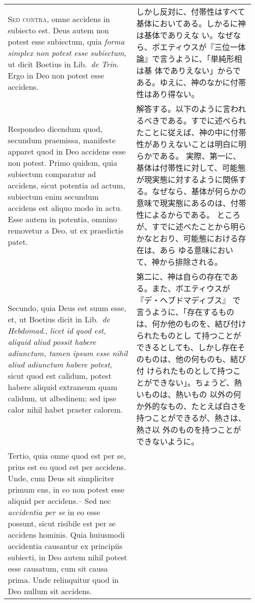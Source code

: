 \documentclass[10pt]{jsarticle} %
\begin{document}
\begin{longtable}{p{21em}p{21em}}
\\


{\scshape Sed contra}, omne accidens in subiecto est. Deus autem non
 potest esse subiectum, quia {\itshape forma simplex non potest esse
 subiectum}, ut dicit Boetius in Lib.~{\itshape de Trin}. Ergo in Deo
 non potest esse accidens.

&

しかし反対に、付帯性はすべて基体においてある。しかるに神は基体でありえな
 い。なぜなら、ボエティウスが『三位一体論』で言うように、「単純形相は基
 体でありえない」からである。ゆえに、神のなかに付帯性はあり得ない。

\\

Respondeo dicendum quod, secundum praemissa, manifeste apparet quod in
 Deo accidens esse non potest. 
Primo quidem, quia subiectum comparatur ad accidens, sicut potentia ad actum, subiectum enim secundum accidens est aliquo modo in actu.
Esse autem in potentia, omnino removetur a Deo, ut ex praedictis patet.

&

解答する。以下のように言われるべきである。すでに述べられたことに従えば、神の中に付帯性がありえないことは明白に明らかである。
実際、第一に、基体は付帯性に対して、可能態が現実態に対するように関係する。なぜなら、基体が何らかの意味で現実態にあるのは、付帯性によるからである。
ところが、すでに述べたことから明らかなとおり、可能態における存在は、あら
 ゆる意味において、神から排除される。


\\

Secundo, quia Deus est suum esse, et, ut Boetius dicit in Lib.~{\itshape de
 Hebdomad}., {\itshape licet id quod est, aliquid aliud possit habere adiunctum,
 tamen ipsum esse nihil aliud adiunctum habere potest}, sicut quod est
 calidum, potest habere aliquid extraneum quam calidum, ut albedinem;
 sed ipse calor nihil habet praeter calorem.

&

第二に、神は自らの存在である。また、ボエティウスが『デ・ヘブドマディブス』
 で言うように、「存在するものは、何か他のものを、結び付けられたものとし
 て持つことができるとしても、しかし存在そのものは、他の何ものも、結び付
 けられたものとして持つことができない」。ちょうど、熱いものは、熱いもの
 以外の何か外的なもの、たとえば白さを持つことができるが、熱さは、熱さ以
 外のものを持つことができないように。

\\

Tertio, quia omne quod est per se, prius est eo quod est per accidens.
Unde, cum Deus sit simpliciter primum ens, in eo non potest esse aliquid
per accidens.-- Sed nec {\itshape accidentia per se} in eo esse possunt,
sicut risibile est per se accidens hominis.  Quia huiusmodi accidentia
causantur ex principiis subiecti, in Deo autem nihil potest esse
causatum, cum sit causa prima. Unde relinquitur quod in Deo nullum sit
accidens.  


\end{longtable}
\end{document}
